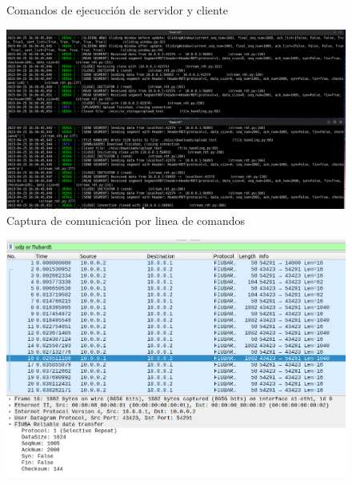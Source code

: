 \documentclass[11pt,a4paper]{article}
\begin{document}
\begin{itemize}
\begin{itemize}
\begin{figure}[H]
\begin{center}
                \end{center}
                \caption{Comandos de ejecucci\'{o}n de servidor y cliente}
            \end{figure}
                \begin{figure}[H]
                    \begin{center}
                    \includegraphics[width=18cm]{images/tests/t1/download/T1_3.2_download_SR_loss0.png}
                    \end{center}
                    \caption{Captura de comunicaci\'{o}n por linea de comandos}
                \end{figure}
                \begin{figure}[H]
                    \begin{center}
                    \includegraphics[width=15cm]{images/tests/t1/download/T1_3.3_download_SR_loss0.png}
                    \end{center}

\end{figure}
\end{itemize}
\end{itemize}
\end{document}
